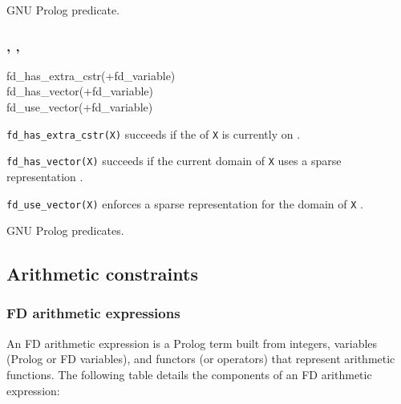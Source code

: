 \Portability

GNU Prolog predicate.

\subsubsection{,
               ,
               }

\begin{TemplatesOneCol}
fd\_has\_extra\_cstr(+fd\_variable)\\
fd\_has\_vector(+fd\_variable)\\
fd\_use\_vector(+fd\_variable)

\end{TemplatesOneCol}

\Description

\texttt{fd\_has\_extra\_cstr(X)} succeeds if the 
of \texttt{X} is currently on .

\texttt{fd\_has\_vector(X)} succeeds if the current domain of \texttt{X}
uses a sparse representation .

\texttt{fd\_use\_vector(X)} enforces a sparse representation for the domain
of \texttt{X} .

\begin{PlErrors}



\end{PlErrors}

\Portability

GNU Prolog predicates.

\subsection{Arithmetic constraints}

\subsubsection{FD arithmetic expressions}
\label{FD-arithmetic-expressions}
An FD arithmetic expression is a Prolog term built from integers, variables
(Prolog or FD variables), and functors (or operators) that represent
arithmetic functions. The following table details the components of an FD
arithmetic expression:


